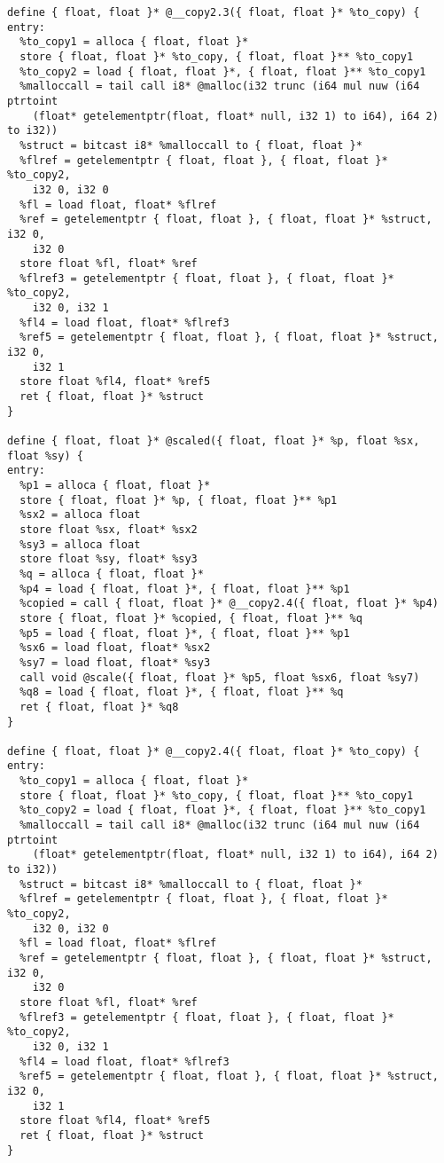\documentclass[main.tex]{subfiles}
\begin{document}
{\begin{lstlisting}
define { float, float }* @__copy2.3({ float, float }* %to_copy) {
entry:
  %to_copy1 = alloca { float, float }*
  store { float, float }* %to_copy, { float, float }** %to_copy1
  %to_copy2 = load { float, float }*, { float, float }** %to_copy1
  %malloccall = tail call i8* @malloc(i32 trunc (i64 mul nuw (i64 ptrtoint 
    (float* getelementptr(float, float* null, i32 1) to i64), i64 2) to i32))
  %struct = bitcast i8* %malloccall to { float, float }*
  %flref = getelementptr { float, float }, { float, float }* %to_copy2, 
    i32 0, i32 0
  %fl = load float, float* %flref
  %ref = getelementptr { float, float }, { float, float }* %struct, i32 0,
    i32 0
  store float %fl, float* %ref
  %flref3 = getelementptr { float, float }, { float, float }* %to_copy2, 
    i32 0, i32 1
  %fl4 = load float, float* %flref3
  %ref5 = getelementptr { float, float }, { float, float }* %struct, i32 0,
    i32 1
  store float %fl4, float* %ref5
  ret { float, float }* %struct
}

define { float, float }* @scaled({ float, float }* %p, float %sx, float %sy) {
entry:
  %p1 = alloca { float, float }*
  store { float, float }* %p, { float, float }** %p1
  %sx2 = alloca float
  store float %sx, float* %sx2
  %sy3 = alloca float
  store float %sy, float* %sy3
  %q = alloca { float, float }*
  %p4 = load { float, float }*, { float, float }** %p1
  %copied = call { float, float }* @__copy2.4({ float, float }* %p4)
  store { float, float }* %copied, { float, float }** %q
  %p5 = load { float, float }*, { float, float }** %p1
  %sx6 = load float, float* %sx2
  %sy7 = load float, float* %sy3
  call void @scale({ float, float }* %p5, float %sx6, float %sy7)
  %q8 = load { float, float }*, { float, float }** %q
  ret { float, float }* %q8
}

define { float, float }* @__copy2.4({ float, float }* %to_copy) {
entry:
  %to_copy1 = alloca { float, float }*
  store { float, float }* %to_copy, { float, float }** %to_copy1
  %to_copy2 = load { float, float }*, { float, float }** %to_copy1
  %malloccall = tail call i8* @malloc(i32 trunc (i64 mul nuw (i64 ptrtoint 
    (float* getelementptr(float, float* null, i32 1) to i64), i64 2) to i32))
  %struct = bitcast i8* %malloccall to { float, float }*
  %flref = getelementptr { float, float }, { float, float }* %to_copy2, 
    i32 0, i32 0
  %fl = load float, float* %flref
  %ref = getelementptr { float, float }, { float, float }* %struct, i32 0, 
    i32 0
  store float %fl, float* %ref
  %flref3 = getelementptr { float, float }, { float, float }* %to_copy2, 
    i32 0, i32 1
  %fl4 = load float, float* %flref3
  %ref5 = getelementptr { float, float }, { float, float }* %struct, i32 0,
    i32 1
  store float %fl4, float* %ref5
  ret { float, float }* %struct
}


\end{lstlisting}}
\end{document}
